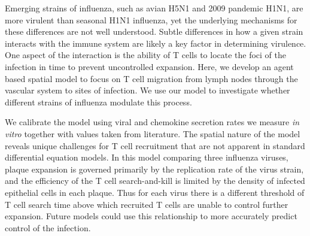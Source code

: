 \documentclass[preprint,10pt,authoryear]{elsarticle}
\begin{document}


Emerging strains of influenza, such as avian H5N1 and 2009 pandemic H1N1, are more virulent than seasonal H1N1 influenza, yet the underlying mechanisms for these differences are not well understood.  Subtle differences in how a given strain interacts with the immune system are likely a key factor in determining virulence.  One aspect of the interaction is the ability of T cells to locate the foci of the infection in time to prevent uncontrolled expansion.  Here, we develop an agent based spatial model to focus on T cell migration from lymph nodes through the vascular system to sites of infection. We use our model to investigate whether different strains of influenza modulate this process.

We calibrate the model using viral and chemokine secretion rates we measure \textit{in vitro} together with values taken from literature.  The spatial nature of the model reveals unique challenges for T cell recruitment that are not apparent in standard differential equation models.  %
In this model comparing three influenza viruses, plaque expansion is governed primarily by the replication rate of the virus strain, and the efficiency of the T cell search-and-kill is limited by the density of infected epithelial cells in each plaque.  Thus for each virus there is a different threshold of T cell search time above which recruited T cells are unable to control further expansion.  Future models could use this relationship to more accurately predict control of the infection.

\end{document}
